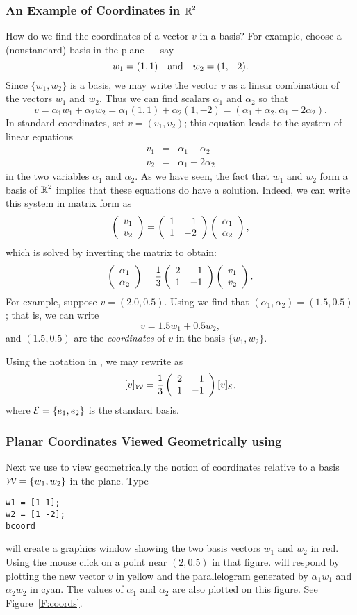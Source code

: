 \documentclass{ximera}
\begin{document}
\subsubsection*{An Example of Coordinates in $\mbox{$\Bbb{R}$}^2$}

How do we find the coordinates of a vector $v$ in a basis?  For example,
choose a (nonstandard) basis in the plane --- say
\[
w_1=(1,1) \quad\mbox{and}\quad w_2=(1,-2).
\]
Since $\{w_1,w_2\}$ is a basis, we may write the vector
$v$ as a linear combination of the vectors $w_1$ and
$w_2$.  Thus we can find scalars $\alpha_1$ and $\alpha_2$ so
that
\[
v=\alpha_1 w_1 + \alpha_2 w_2 = \alpha_1(1,1)+\alpha_2(1,-2)
= (\alpha_1+ \alpha_2,\alpha_1 -2 \alpha_2).
\]
In standard coordinates, set $v=(v_1,v_2)$; this equation leads to the
system of linear equations
\begin{eqnarray*}
v_1 & = & \alpha_1 + \alpha_2 \\
v_2 & = & \alpha_1 -2 \alpha_2
\end{eqnarray*}
in the two variables $\alpha_1$ and $\alpha_2$. As we have seen,
the fact that $w_1$ and $w_2$ form a basis of $\mbox{$\Bbb{R}$}^2$ implies that
these equations do have a solution.  Indeed, we can write this
system in matrix form as
\[
\left(\begin{array}{r} v_1 \\ v_2\end{array}\right) = \left(\begin{array}{rr} 1 & 1\\ 1 &-2\end{array}\right)\left(\begin{array}{r} \alpha_1 \\ \alpha_2\end{array}\right),
\]
which is solved by inverting the matrix to obtain:
\begin{equation} \label{change1}
\left(\begin{array}{r} \alpha_1 \\ \alpha_2\end{array}\right)= \frac{1}{3}\left(\begin{array}{rr} 2 & 1\\ 1 &-1\end{array}\right)
\left(\begin{array}{r} v_1 \\ v_2\end{array}\right).
\end{equation}
For example, suppose $v=(2.0,0.5)$.  Using  we find that
$(\alpha_1,\alpha_2)=(1.5,0.5)$; that is, we can write
\[
v = 1.5w_1 + 0.5w_2,
\]
and $(1.5,0.5)$ are the {\em coordinates\/}  of
$v$ in the basis $\{w_1,w_2\}$.

Using the notation in , we may rewrite  as
\[
[v]_{\cal W} = \frac{1}{3}\left(\begin{array}{rr} 2 & 1\\ 1 &-1\end{array}\right) [v]_{\cal E},
\]
where ${\cal E} = \{e_1,e_2\}$ is the standard basis.

\subsubsection*{Planar Coordinates Viewed Geometrically using \Matlab}

Next we use \Matlab to view geometrically the notion of coordinates
relative to a basis ${\cal W}=\{w_1,w_2\}$ in the plane.  Type
\begin{verbatim}
w1 = [1 1];
w2 = [1 -2];
bcoord
\end{verbatim} 
\Matlab will create a graphics window showing the two basis vectors
$w_1$ and $w_2$ in red.  Using the mouse click on a point near
$(2,0.5)$ in that figure.  \Matlab will respond by plotting the
new vector $v$ in yellow and the parallelogram generated by
$\alpha_1w_1$ and $\alpha_2w_2$ in cyan.  The values of $\alpha_1$
and $\alpha_2$ are also plotted on this figure.  See
Figure~\ref{F:coords}.
\end{document}
